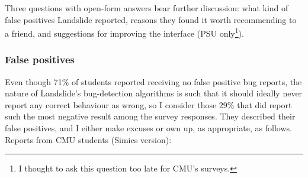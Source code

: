 Three questions with open-form answers bear further discussion:
what kind of false positives Landslide reported, %
reasons they found it worth recommending to a friend,
and suggestions for improving the interface
(PSU only\footnote{I thought to ask this question too late for CMU's surveys.}). %

\subsubsection{False positives}

Even though 71\% of students reported receiving no false positive bug reports,
the nature of Landslide's bug-detection algorithms is such
that it should ideally never report any correct behaviour as wrong,
so I consider those 29\% that did report such the most negative result among the survey responses.
They described their false positives, and I either make excuses or own up, as appropriate, as follows.
Reports from CMU students (Simics version):
